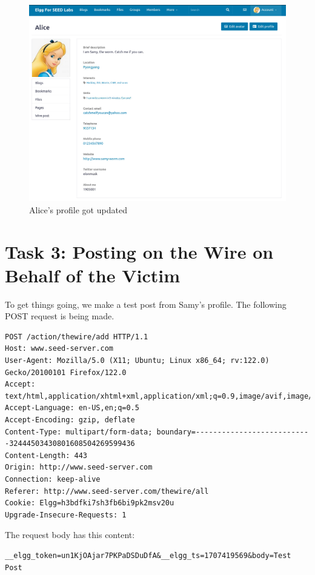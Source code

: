 \documentclass[12pt]{article}
\begin{document}
     \begin{figure}[H]
         \centering
         \includegraphics[width=\textwidth]{Images/ss3.png}
         \caption{Alice's profile got updated}
         \label{fig:ss3}
     \end{figure}

\newpage
\section*{Task 3: Posting on the Wire on Behalf of the Victim}
To get things going, we make a test post from Samy's profile. The following POST request is being made.

\begin{verbatim}
POST /action/thewire/add HTTP/1.1
Host: www.seed-server.com
User-Agent: Mozilla/5.0 (X11; Ubuntu; Linux x86_64; rv:122.0) Gecko/20100101 Firefox/122.0
Accept: text/html,application/xhtml+xml,application/xml;q=0.9,image/avif,image/webp,*/*;q=0.8
Accept-Language: en-US,en;q=0.5
Accept-Encoding: gzip, deflate
Content-Type: multipart/form-data; boundary=---------------------------32444503430801608504269599436
Content-Length: 443
Origin: http://www.seed-server.com
Connection: keep-alive
Referer: http://www.seed-server.com/thewire/all
Cookie: Elgg=h3bdfki7sh3fb6bi9pk2msv20u
Upgrade-Insecure-Requests: 1
\end{verbatim}

The request body has this content:

\begin{verbatim}
__elgg_token=un1KjOAjar7PKPaDSDuDfA&__elgg_ts=1707419569&body=Test Post
\end{verbatim}
\end{document}
